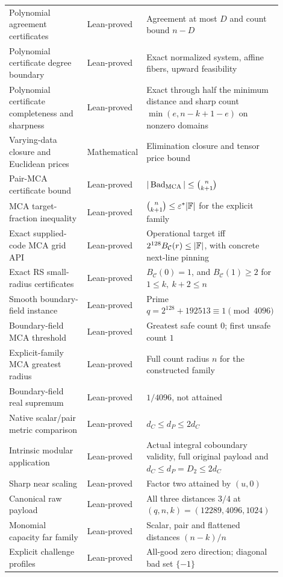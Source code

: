 \begin{longtable}{@{}>{\raggedright\arraybackslash}p{0.42\linewidth}
  >{\raggedright\arraybackslash}p{0.20\linewidth}
  >{\raggedright\arraybackslash}p{0.28\linewidth}@{}}
Polynomial agreement certificates & Lean-proved & Agreement at most \(D\)
  and count bound \(n-D\)\\
Polynomial certificate degree boundary & Lean-proved & Exact normalized
  system, affine fibers, upward feasibility\\
Polynomial certificate completeness and sharpness & Lean-proved & Exact
  through half the minimum distance and sharp count \(\min(e,n-k+1-e)\)
  on nonzero domains\\
Varying-data closure and Euclidean prices & Mathematical & Elimination
  closure and tensor price bound\\
Pair-MCA certificate bound & Lean-proved &
  \(|\operatorname{Bad}_{\operatorname{MCA}}|\le\binom n{k+1}\)\\
MCA target-fraction inequality & Lean-proved &
  \(\binom n{k+1}\le\varepsilon^\ast|\mathbb{F}|\) for the explicit family\\
Exact supplied-code MCA grid API & Lean-proved &
  Operational target iff \(2^{128}B_{\mathcal C}(r)\le|\mathbb{F}|\), with
  concrete next-line pinning\\
Exact RS small-radius certificates & Lean-proved &
  \(B_{\mathcal C}(0)=1\), and \(B_{\mathcal C}(1)\ge2\) for
  \(1\le k,\ k+2\le n\)\\
Smooth boundary-field instance & Lean-proved &
  Prime \(q=2^{128}+192513\equiv1\pmod {4096}\)\\
Boundary-field MCA threshold & Lean-proved &
  Greatest safe count \(0\); first unsafe count \(1\)\\
Explicit-family MCA greatest radius & Lean-proved &
  Full count radius \(n\) for the constructed family\\
Boundary-field real supremum & Lean-proved &
  \(1/4096\), not attained\\
Native scalar/pair metric comparison & Lean-proved &
  \(d_C\le d_P\le2d_C\)\\
Intrinsic modular application & Lean-proved & Actual integral coboundary
  validity, full original payload and \(d_C\le d_P=D_2\le2d_C\)\\
Sharp near scaling & Lean-proved & Factor two attained by \((u,0)\)\\
Canonical raw payload & Lean-proved & All three distances \(3/4\) at
  \((q,n,k)=(12289,4096,1024)\)\\
Monomial capacity far family & Lean-proved &
  Scalar, pair and flattened distances \((n-k)/n\)\\
Explicit challenge profiles & Lean-proved &
  All-good zero direction; diagonal bad set \(\{-1\}\)\\

\end{longtable}
